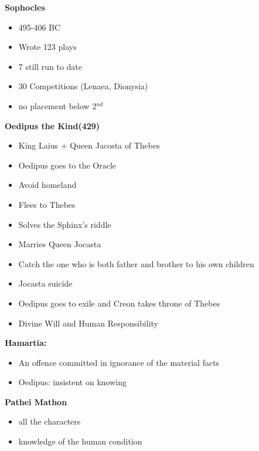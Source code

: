 \documentclass[12pt,a4paper]{report}
\begin{document}
\textbf{Sophocles}
\begin{itemize}
\item 495-406 BC
\item Wrote 123 plays
\item 7 still run to date
\item 30 Competitions (Lenaea, Dionysia)
\item no placement below 2$^{nd}$
\end{itemize}

\textbf{Oedipus the Kind(429)}
\begin{itemize}
\item King Laius + Queen Jacosta of Thebes
\item Oedipus goes to the Oracle
\item Avoid homeland
\item Flees to Thebes
\item Solves the Sphinx's riddle
\item Marries Queen Jocasta
\item Catch the one who is both father and brother to his own children
\item Jocasta suicide
\item Oedipus goes to exile and Creon takes throne of Thebes
\item Divine Will and Human Responsibility
\end{itemize}

\textbf{Hamartia:}
\begin{itemize}
\item An offence committed in ignorance of the material facts
\item Oedipus: insistent on knowing
\end{itemize}

\textbf{Pathei Mathon}
\begin{itemize}
\item all the characters
\item knowledge of the human condition
\end{itemize}
\end{document}

